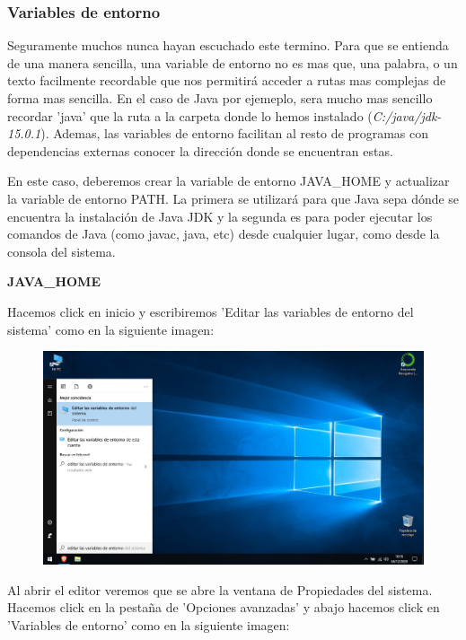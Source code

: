\documentclass[a4paper,10pt]{article}
\begin{document}
\clearpage

\subsubsection{Variables de entorno}

Seguramente muchos nunca hayan escuchado este termino. Para que se entienda de una manera sencilla, una variable de entorno no es mas que, una palabra, o un texto facilmente recordable que nos permitirá acceder a rutas mas complejas de forma mas sencilla. En el caso de Java por ejemeplo, sera mucho mas sencillo recordar 'java' que la ruta a la carpeta donde lo hemos instalado (\textit{C:/java/jdk-15.0.1}). Ademas, las variables de entorno facilitan al resto de programas con dependencias externas conocer la dirección donde se encuentran estas.

En este caso, deberemos crear la variable de entorno JAVA\_HOME y actualizar la variable de entorno PATH. La primera se utilizará para que Java sepa dónde se encuentra la instalación de Java JDK y la segunda es para poder ejecutar los comandos de Java (como javac, java, etc) desde cualquier lugar, como desde la consola del sistema. 

\textbf{JAVA\_HOME}

Hacemos click en inicio y escribiremos 'Editar las variables de entorno del sistema' como en la siguiente imagen:

\begin{figure}[H]
\begin{center}
\includegraphics[width=425pt]{./fotos/introduccion/7 - Java.jpg}
\end{center}
\end{figure}

Al abrir el editor veremos que se abre la ventana de Propiedades del sistema. Hacemos click en la pestaña de 'Opciones avanzadas' y abajo hacemos click en 'Variables de entorno' como en la siguiente imagen:
\end{document}
